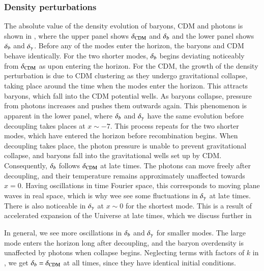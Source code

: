 \subsubsection{Density perturbations} \label{sssec:M3:results:density_perturbations}
The absolute value of the density evolution of baryons, CDM and photons is shown in , where the upper panel shows $\delta_\mathrm{CDM}$ and $\delta_b$ and the lower panel shows $\delta_b$ and $\delta_\gamma$. Before any of the modes enter the horizon, the baryons and CDM behave identically. For the two shorter modes, $\delta_b$ begins deviating noticeably from $\delta_\mathrm{CDM}$ as upon entering the horizon. For the CDM, the growth of the density perturbation is due to CDM clustering as they undergo gravitational collapse, taking place around the time when the modes enter the horizon. This attracts baryons, which fall into the CDM potential wells. As baryons collapse, pressure from photons increases and pushes them outwards again. This phenomenon is apparent in the lower panel, where $\delta_b$ and $\delta_\gamma$ have the same evolution before decoupling takes places at $x\sim-7$. This process repeats for the two shorter modes, which have entered the horizon before recombination begins. When decoupling takes place, the photon pressure is unable to prevent gravitational collapse, and baryons fall into the gravitational wells set up by CDM. Consequently, $\delta_b$ follows $\delta_\mathrm{CDM}$ at late times. The photons can move freely after decoupling, and their temperature remains approximately unaffected towards $x=0$. Having oscillations in time Fourier space, this corresponds to moving plane waves in real space, which is why wee see some fluctuations in $\delta_\gamma$ at late times. There is also noticeable in $\delta_\gamma$ at $x\sim0$ for the shortest mode. This is a result of accelerated expansion of the Universe at late times, which we discuss further in      

In general, we see more oscillations in $\delta_b$ and $\delta_\gamma$ for smaller modes. The large mode enters the horizon long after decoupling, and the baryon overdensity is unaffected by photons when collapse begins. Neglecting terms with factors of $k$ in , we get $\delta_b=\delta_\mathrm{CDM}$ at all times, since they have identical initial conditions. 


